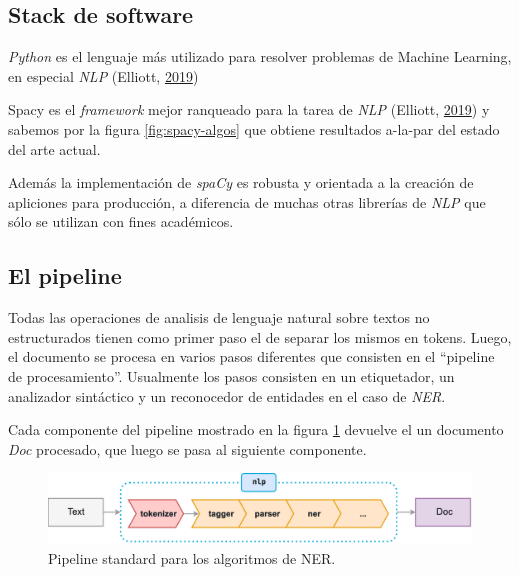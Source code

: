 \documentclass[12pt,a4paper,]{scrartcl}
\begin{document}
\hypertarget{stack-de-software}{%
\subsection{Stack de software}\label{stack-de-software}}

\emph{Python} es el lenguaje más utilizado para resolver problemas de Machine Learning, en especial \emph{NLP} (Elliott, \protect\hyperlink{ref-github_machine_learning}{2019})

Spacy es el \emph{framework} mejor ranqueado para la tarea de \emph{NLP} (Elliott, \protect\hyperlink{ref-github_machine_learning}{2019}) y sabemos por la figura \ref{fig:spacy-algos} que obtiene resultados a-la-par del estado del arte actual.

Además la implementación de \emph{spaCy} es robusta y orientada a la creación de apliciones para producción, a diferencia de muchas otras librerías de \emph{NLP} que sólo se utilizan con fines académicos.

\hypertarget{el-pipeline}{%
\subsection{El pipeline}\label{el-pipeline}}

Todas las operaciones de analisis de lenguaje natural sobre textos no estructurados tienen como primer paso el de separar los mismos en tokens. Luego, el documento se procesa en varios pasos diferentes que consisten en el \enquote{pipeline de procesamiento}. Usualmente los pasos consisten en un etiquetador, un analizador sintáctico y un reconocedor de entidades en el caso de \emph{NER}.

Cada componente del pipeline mostrado en la figura \ref{fig:spacy-pipeline} devuelve el un documento \emph{Doc} procesado, que luego se pasa al siguiente componente.

\begin{figure}[H]

{\centering \includegraphics{assets/spacy_pipeline.pdf} 

}

\caption{Pipeline standard para los algoritmos de NER.}\label{fig:spacy-pipeline}
\end{figure}
\end{document}
